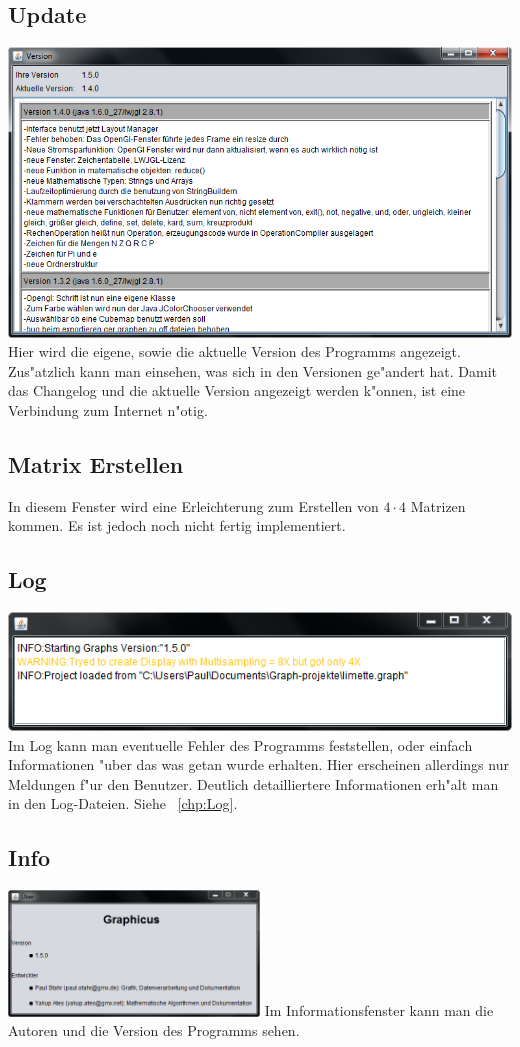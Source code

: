 \documentclass{scrartcl}
\begin{document}
\subsection{Update}
\label{chp:Update_Fenster}
\includegraphics[width=1\textwidth]{images/program/update-window.png}\newline
Hier wird die eigene, sowie die aktuelle Version des Programms angezeigt. Zus"atzlich kann man einsehen, was sich in den Versionen ge"andert hat. Damit das Changelog und die aktuelle Version angezeigt werden k"onnen, ist eine Verbindung zum Internet n"otig.
\subsection{Matrix Erstellen}
In diesem Fenster wird eine Erleichterung zum Erstellen von \(4 \cdot 4\) Matrizen kommen. Es ist jedoch noch nicht fertig implementiert.
\subsection{Log}
\label{chp:Log_Fenster}
\includegraphics[width=1\textwidth]{images/program/log-window.png}\newline
Im Log kann man eventuelle Fehler des Programms feststellen, oder einfach Informationen "uber das was getan wurde erhalten. Hier erscheinen allerdings nur Meldungen f"ur den Benutzer. Deutlich detailliertere Informationen erh"alt man in den Log-Dateien. Siehe ~\ref{chp:Log}.
\subsection{Info}
\label{chp:Info_Fenster}
\includegraphics[width=0.5\textwidth]{images/program/info-window.png}\newline
Im Informationsfenster kann man die Autoren und die Version des Programms sehen.
\newpage
\end{document}
